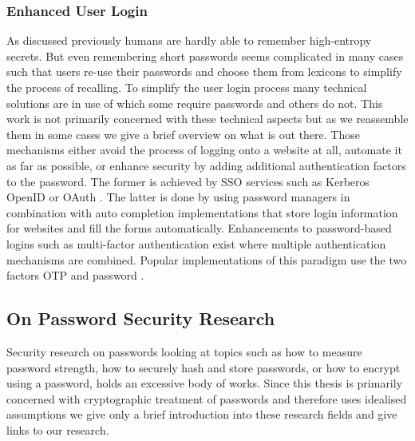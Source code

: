 \subsubsection{Enhanced User Login} \label{sec:enhanced-login}
As discussed previously humans are hardly able to remember high-entropy secrets.
But even remembering short passwords seems complicated in many cases such that users re-use their passwords and choose them from lexicons to simplify the process of recalling.
To simplify the user login process many technical solutions are in use of which some require passwords and others do not.
This work is not primarily concerned with these technical aspects but as we reassemble them in some cases we give a brief overview on what is out there.
Those mechanisms either avoid the process of logging onto a website at all, automate it as far as possible, or enhance security by adding additional authentication factors to the password.
The former is achieved by \ac{SSO} services such as Kerberos \cite{rfc4120} OpenID \cite{OpenID} or OAuth \cite{rfc6749}.
The latter is done by using password managers in combination with auto completion implementations that store login information for websites and fill the forms automatically.
Enhancements to password-based logins such as multi-factor authentication \cite{FleischhackerMA14} exist where multiple authentication mechanisms are combined.
Popular implementations of this paradigm use the two factors \ac{OTP} and password \cite{Google2Factor,FB2Factor,Twitter2Factor,Github2Factor}.


\subsection{On Password Security Research}
Security research on passwords looking at topics such as how to measure password strength, how to securely hash and store passwords, or how to encrypt using a password, holds an excessive body of works.
Since this thesis is primarily concerned with cryptographic treatment of passwords and therefore uses idealised assumptions we give only a brief introduction into these research fields and give links to our research.


